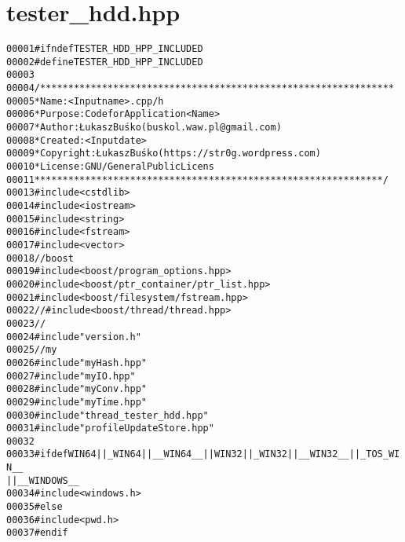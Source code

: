 \hypertarget{tester__hdd_8hpp_source}{
\section{tester\_\-hdd.hpp}
}


\begin{footnotesize}\begin{alltt}
00001 \textcolor{preprocessor}{#ifndef TESTER\_HDD\_HPP\_INCLUDED}
00002 \textcolor{preprocessor}{}\textcolor{preprocessor}{#define TESTER\_HDD\_HPP\_INCLUDED}
00003 \textcolor{preprocessor}{}
00004 \textcolor{comment}{/***************************************************************}
00005 \textcolor{comment}{ * Name:      <Input name>.cpp/h}
00006 \textcolor{comment}{ * Purpose:   Code for Application <Name>}
00007 \textcolor{comment}{ * Author:    Łukasz Buśko (buskol.waw.pl@gmail.com)}
00008 \textcolor{comment}{ * Created:   <Input date>}
00009 \textcolor{comment}{ * Copyright: Łukasz Buśko (https://str0g.wordpress.com)}
00010 \textcolor{comment}{ * License:   GNU / General Public Licens}
00011 \textcolor{comment}{ **************************************************************/}
00013 \textcolor{preprocessor}{#include <cstdlib>}
00014 \textcolor{preprocessor}{#include <iostream>}
00015 \textcolor{preprocessor}{#include <string>}
00016 \textcolor{preprocessor}{#include <fstream>}
00017 \textcolor{preprocessor}{#include <vector>}
00018 \textcolor{comment}{//boost}
00019 \textcolor{preprocessor}{#include <boost/program\_options.hpp>}
00020 \textcolor{preprocessor}{#include <boost/ptr\_container/ptr\_list.hpp>}
00021 \textcolor{preprocessor}{#include <boost/filesystem/fstream.hpp>}
00022 \textcolor{comment}{//#include <boost/thread/thread.hpp>}
00023 \textcolor{comment}{//}
00024 \textcolor{preprocessor}{#include "version.h"}
00025 \textcolor{comment}{//my}
00026 \textcolor{preprocessor}{#include "myHash.hpp"}
00027 \textcolor{preprocessor}{#include "myIO.hpp"}
00028 \textcolor{preprocessor}{#include "myConv.hpp"}
00029 \textcolor{preprocessor}{#include "myTime.hpp"}
00030 \textcolor{preprocessor}{#include "thread\_tester\_hdd.hpp"}
00031 \textcolor{preprocessor}{#include "profileUpdateStore.hpp"}
00032 
00033 \textcolor{preprocessor}{#ifdef WIN64 || \_WIN64 || \_\_WIN64\_\_ || WIN32 || \_WIN32 || \_\_WIN32\_\_ || \_TOS\_WIN\_\_
       || \_\_WINDOWS\_\_}
00034 \textcolor{preprocessor}{}\textcolor{preprocessor}{#include <windows.h>}
00035 \textcolor{preprocessor}{#else}
00036 \textcolor{preprocessor}{}\textcolor{preprocessor}{#include <pwd.h>}
00037 \textcolor{preprocessor}{#endif}

\end{alltt}
\end{footnotesize}
